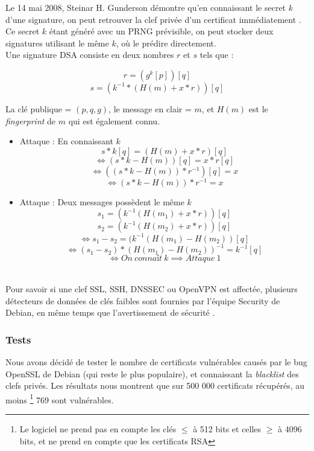			Le 14 mai 2008, Steinar H. Gunderson démontre qu'en connaissant le secret $k$ d'une signature, on peut retrouver la clef privée d'un certificat immédiatement \cite{gunderson2008}. Ce secret $k$ étant généré avec un PRNG prévisible, on peut stocker deux signatures utilisant le même $k$, où le prédire directement.\\
		
			Une signature DSA consiste en deux nombres $r$ et $s$ tels que :
			
			$$r = (g^k [p]) [q]$$
			$$s = (k^{-1} * (H(m) + x * r)) [q]$$
		
			La clé publique = $(p, q, g)$, le message en clair = $m$, et $H(m)$ est le \textit{fingerprint} de $m$ qui est également connu.
		
			\begin{itemize}
			\item Attaque  : En connaissant $k$
			$$s * k [q] = (H(m) + x*r) [q]$$
			$$\iff (s * k - H(m)) [q] = x*r [q]$$
			$$\iff ((s*k - H(m))*r^{-1})[q] = x$$
			$$\iff (s*k - H(m))*r^{-1} = x$$
	
			\item Attaque  : Deux messages possèdent le même $k$
			$$s_1 = (k^{-1} (H(m_1) + x*r)) [q]$$
			$$s_2 = (k^{-1} (H(m_2) + x*r)) [q]$$
			$$\iff s_1 - s_2 = (k^{-1} (H(m_1) - H(m_2)) [q]$$
			$$\iff (s_1 - s_2)*(H(m_1) - H(m_2))^{-1} = k^{-1} [q]$$
			$$\iff On\ connaît\ k \implies Attaque\ 1$$\\
			\end{itemize}
	
			Pour savoir si une clef SSL, SSH, DNSSEC ou OpenVPN est affectée, plusieurs détecteurs de données \cite{dowkd.pl} \cite{openssl-blacklist} de clés faibles sont fournies par l'équipe Security de Debian, en même temps que l'avertissement de sécurité \cite{debian2008bug}.\\ 
	
		\subsubsection{Tests}
	
			Nous avons décidé de tester le nombre de certificats vulnérables causés 	par le bug OpenSSL de Debian (qui reste le plus populaire), et connaissant la \textit{blacklist} des clefs privés. Les résultats nous montrent que sur 500 000 certificats récupérés, au moins \footnote{Le logiciel ne prend pas en compte les clés $\leq$ à 512 bits et celles $\geq$ à 4096 bits, et ne prend en compte que les certificats RSA} 769 sont vulnérables.\\
			
